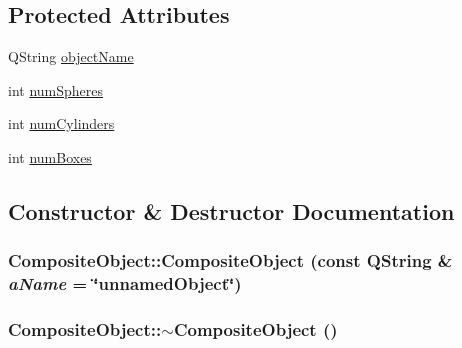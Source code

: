 \subsection*{Protected Attributes}
\begin{DoxyCompactItemize}
\item 
QString \hyperlink{class_robot_model_1_1_composite_object_a4e833bb302d4a1a791211261251eff68}{objectName}
\item 
int \hyperlink{class_robot_model_1_1_composite_object_ad2f0b50dd12a6d6cba7d48c65266490a}{numSpheres}
\item 
int \hyperlink{class_robot_model_1_1_composite_object_a316bb31790aa7d8905a31523890187b3}{numCylinders}
\item 
int \hyperlink{class_robot_model_1_1_composite_object_a05fb383ad49f9da7da584b12804e4f19}{numBoxes}
\end{DoxyCompactItemize}


\subsection{Constructor \& Destructor Documentation}
\hypertarget{class_robot_model_1_1_composite_object_a28feebceeaeec6c4d4ec6adc9fc52d90}{
\subsubsection[{CompositeObject}]{\setlength{\rightskip}{0pt plus 5cm}CompositeObject::CompositeObject (const QString \& {\em aName} = {\ttfamily \char`\"{}unnamedObject\char`\"{}})}}
\label{class_robot_model_1_1_composite_object_a28feebceeaeec6c4d4ec6adc9fc52d90}
\hypertarget{class_robot_model_1_1_composite_object_a52c02078b1e3e9f4f436874fb044a27b}{
\subsubsection[{$\sim$CompositeObject}]{\setlength{\rightskip}{0pt plus 5cm}CompositeObject::$\sim$CompositeObject ()}}
\label{class_robot_model_1_1_composite_object_a52c02078b1e3e9f4f436874fb044a27b}


